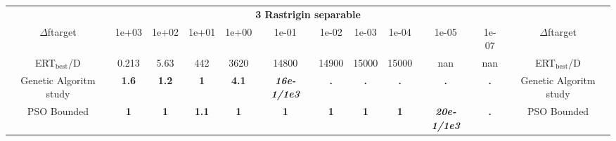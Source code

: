 \begin{tabular}{cccccccccccc}
 & \multicolumn{10}{c}{{\normalsize \textbf{3 Rastrigin separable}}}\\
$\Delta$ftarget& 1e+03& 1e+02& 1e+01& 1e+00& 1e-01& 1e-02& 1e-03& 1e-04& 1e-05& 1e-07 & $\Delta$ftarget \\
ERT$_{\textrm{best}}$/D& 0.213& 5.63& 442& 3620& 14800& 14900& 15000& 15000& nan& nan & ERT$_{\textrm{best}}$/D \\
\hline
Genetic Algoritm study & \textbf{1.6} & \textbf{1.2} & \textbf{1} & \textbf{4.1} & \textbf{\textit{16e-1}\textit{/1e3}} & \textbf{.} & \textbf{.} & \textbf{.} & \textbf{.} & \textbf{.} & Genetic Algoritm study \cite{add_an_entry_for_Genetic Algoritm study_in_bbob.bib}\\
PSO Bounded & \textbf{1} & \textbf{1} & \textbf{1.1} & \textbf{1} & \textbf{1} & \textbf{1} & \textbf{1} & \textbf{1} & \textbf{\textit{20e-1}\textit{/1e3}} & \textbf{.} & PSO Bounded \cite{add_an_entry_for_PSO Bounded_in_bbob.bib}
\end{tabular}
